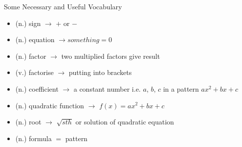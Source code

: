 \documentclass[final]{beamer}
\newlength{\onecolwid}
\begin{document}
\begin{frame}[t]
\begin{columns}[t]
\begin{column}{\onecolwid}
      \begin{alertblock}{Some Necessary and Useful Vocabulary}

        \begin{itemize}
        \item (n.) sign $\rightarrow$ $+$ or $-$
        \item (n.) equation $\rightarrow something = 0$
        \item (n.) factor $\rightarrow$ two multiplied factors give result
        \item (v.) factorise $\rightarrow$ putting into brackets
        \item (n.) coefficient $\rightarrow$ a constant number i.e. $a$, $b$, $c$ in a pattern $ax^2+bx+c$
        \item (n.) quadratic function $\rightarrow$ $f(x) = ax^2+bx+c$
        \item (n.) root $\rightarrow$ $\sqrt{sth}$ or solution of quadratic equation
        \item (n.) formula $=$ pattern
        \end{itemize}

      \end{alertblock}



    \end{column} %

  \end{columns} %

\end{frame} %
\end{document}
